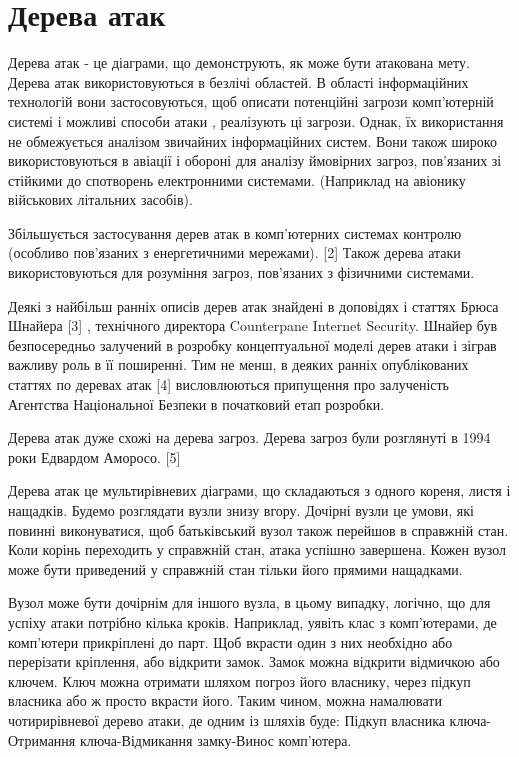 \section{Дерева атак}
\label{2section:id14}
Дерева атак - це діаграми, що демонструють, як може бути атакована мету. Дерева атак використовуються в безлічі областей. В області інформаційних технологій вони застосовуються, щоб описати потенційні загрози комп'ютерній системі і можливі способи атаки , реалізують ці загрози. Однак, їх використання не обмежується аналізом звичайних інформаційних систем. Вони також широко використовуються в авіації і обороні для аналізу ймовірних загроз, пов'язаних зі стійкими до спотворень електронними системами. (Наприклад на авіонику військових літальних засобів).

Збільшується застосування дерев атак в комп'ютерних системах контролю (особливо пов'язаних з енергетичними мережами). {[}2{]} Також дерева атаки використовуються для розуміння загроз, пов'язаних з фізичними системами.

Деякі з найбільш ранніх описів дерев атак знайдені в доповідях і статтях Брюса Шнайера {[}3{]} , технічного директора Counterpane Internet Security. Шнайер був безпосередньо залучений в розробку концептуальної моделі дерев атаки і зіграв важливу роль в її поширенні. Тим не менш, в деяких ранніх опублікованих статтях по деревах атак {[}4{]} висловлюються припущення про залученість Агентства Національної Безпеки в початковий етап розробки.

Дерева атак дуже схожі на дерева загроз. Дерева загроз були розглянуті в 1994 роки Едвардом Аморосо. {[}5{]}

Дерева атак це мультирівневих діаграми, що складаються з одного кореня, листя і нащадків. Будемо розглядати вузли знизу вгору. Дочірні вузли це умови, які повинні виконуватися, щоб батьківський вузол також перейшов в справжній стан. Коли корінь переходить у справжній стан, атака успішно завершена. Кожен вузол може бути приведений у справжній стан тільки його прямими нащадками.

Вузол може бути дочірнім для іншого вузла, в цьому випадку, логічно, що для успіху атаки потрібно кілька кроків. Наприклад, уявіть клас з комп'ютерами, де комп'ютери прикріплені до парт. Щоб вкрасти один з них необхідно або перерізати кріплення, або відкрити замок. Замок можна відкрити відмичкою або ключем. Ключ можна отримати шляхом погроз його власнику, через підкуп власника або ж просто вкрасти його. Таким чином, можна намалювати чотирирівневої дерево атаки, де одним із шляхів буде: Підкуп власника ключа-Отримання ключа-Відмикання замку-Винос комп'ютера.

